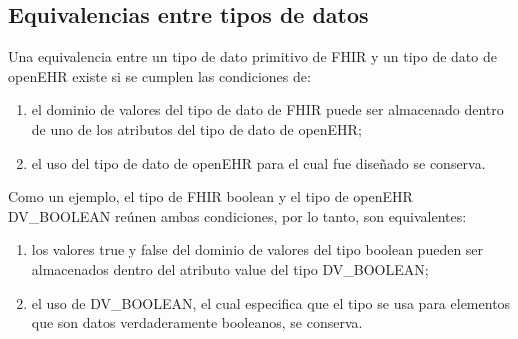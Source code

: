 \subsection{Equivalencias entre tipos de datos}

Una equivalencia entre un tipo de dato primitivo de FHIR y un tipo de dato de openEHR existe si se cumplen las condiciones de:

\begin{enumerate}
  \item el dominio de valores del tipo de dato de FHIR puede ser almacenado dentro de uno de los atributos del tipo de dato de openEHR;
  \item el uso del tipo de dato de openEHR para el cual fue diseñado se conserva.
\end{enumerate}

Como un ejemplo, el tipo de FHIR boolean y el tipo de openEHR DV\_BOOLEAN reúnen ambas condiciones, por lo tanto, son equivalentes:
\begin{enumerate}
  \item los valores true y false del dominio de valores del tipo boolean pueden ser almacenados dentro del atributo value del tipo DV\_BOOLEAN;
  \item el uso de DV\_BOOLEAN, el cual especifica que el tipo se usa para elementos que son datos verdaderamente booleanos, se conserva.
\end{enumerate}
